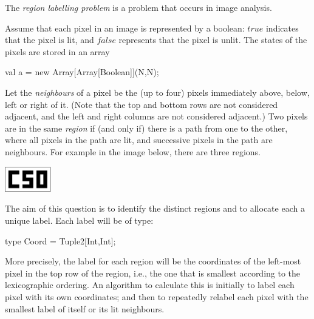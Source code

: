 \begin{question}
The \emph{region labelling problem} is a problem that occurs in image
analysis.  

Assume that each pixel in an image is represented by a boolean: $true$
indicates that the pixel is lit, and $false$ represents that the pixel is
unlit.  The states of the pixels are stored in an array
%
\begin{scala}
  val a = new Array[Array[Boolean]](N,N);
\end{scala}

Let the \emph{neighbours} of a pixel be the (up to four) pixels immediately
above, below, left or right of it.  (Note that the top and bottom rows are not
considered adjacent, and the left and right columns are not considered
adjacent.)  Two pixels are in the same \emph{region} if (and only if) there is
a path from one to the other, where all pixels in the path are lit, and
successive pixels in the path are neighbours.  For example in the image below,
there are three regions.
%
\begin{center}
\includegraphics[width=2cm]{regions.eps}
\end{center}

The aim of this question is to identify the distinct regions and to allocate
each a unique label.  Each label will be of type:
%
\begin{scala}
  type Coord = Tuple2[Int,Int];
\end{scala}
%
More precisely, the label for each region will be the coordinates of the
left-most pixel in the top row of the region, i.e., the one that is smallest
according to the lexicographic ordering.
%
%
An algorithm to calculate this is initially to label each pixel with its own
coordinates; and then to repeatedly relabel each pixel with the smallest label
of itself or its lit neighbours.
%


\end{question}
